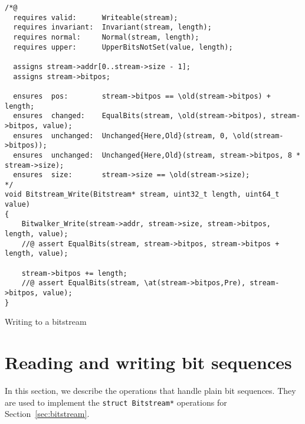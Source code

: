 \begin{listing}[hbt]
\begin{minipage}{0.99\textwidth}
\begin{lstlisting}[style=acsl-block]
/*@
  requires valid:      Writeable(stream);
  requires invariant:  Invariant(stream, length);
  requires normal:     Normal(stream, length);
  requires upper:      UpperBitsNotSet(value, length);

  assigns stream->addr[0..stream->size - 1];
  assigns stream->bitpos;

  ensures  pos:        stream->bitpos == \old(stream->bitpos) + length;
  ensures  changed:    EqualBits(stream, \old(stream->bitpos), stream->bitpos, value);
  ensures  unchanged:  Unchanged{Here,Old}(stream, 0, \old(stream->bitpos));
  ensures  unchanged:  Unchanged{Here,Old}(stream, stream->bitpos, 8 * stream->size);
  ensures  size:       stream->size == \old(stream->size);
*/
void Bitstream_Write(Bitstream* stream, uint32_t length, uint64_t value)
{
    Bitwalker_Write(stream->addr, stream->size, stream->bitpos, length, value);
    //@ assert EqualBits(stream, stream->bitpos, stream->bitpos + length, value);

    stream->bitpos += length;
    //@ assert EqualBits(stream, \at(stream->bitpos,Pre), stream->bitpos, value);
}

\end{lstlisting}
\end{minipage}
\caption{\label{lst:Bitstream_Write impl}Writing to a bitstream}
\end{listing}














\FloatBarrier

\section{Reading and writing bit sequences}
\label{sec:bit sequences}

In this section, we describe the operations that handle plain bit sequences.
%
They are used to implement the \lstinline{struct Bitstream*} operations for
Section~\ref{sec:bitstream}.

